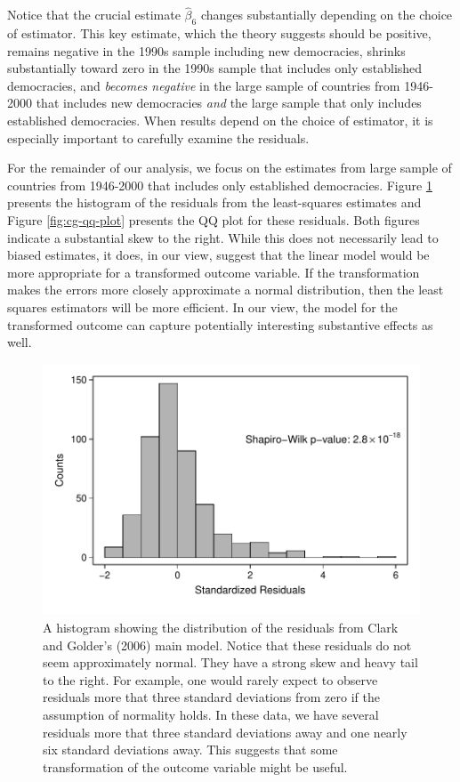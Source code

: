 \documentclass[12pt]{article}
\begin{document}
Notice that the crucial estimate $\hat{\beta}_6$ changes substantially depending on the choice of estimator. This key estimate, which the theory suggests should be positive, remains negative in the 1990s sample including new democracies, shrinks substantially toward zero in the 1990s sample that includes only established democracies, and \textit{becomes negative} in the large sample of countries from 1946-2000 that includes new democracies \textit{and} the large sample that only includes established democracies. When results depend on the choice of estimator, it is especially important to carefully examine the residuals.

For the remainder of our analysis, we focus on the estimates from large sample of countries from 1946-2000 that includes only established democracies. Figure \ref{fig:cg-residuals-hist} presents the histogram of the residuals from the least-squares estimates and Figure \ref{fig:cg-qq-plot} presents the QQ plot for these residuals. Both figures indicate a substantial skew to the right. While this does not necessarily lead to biased estimates, it does, in our view, suggest that the linear model would be more appropriate for a transformed outcome variable. If the transformation makes the errors more closely approximate a normal distribution, then the least squares estimators will be more efficient. In our view, the model for the transformed outcome can capture potentially interesting substantive effects as well.

\begin{figure}[H]
\begin{center}
\includegraphics[scale = 0.6]{figs/cg-residuals-hist.pdf}
\caption{A histogram showing the distribution of the residuals from Clark and Golder's (2006) main model. Notice that these residuals do not seem approximately normal. They have a strong skew and heavy tail to the right. For example, one would rarely expect to observe residuals more that three standard deviations from zero if the assumption of normality holds. In these data, we have several residuals more that three standard deviations away and one nearly six standard deviations away. This suggests that some transformation of the outcome variable might be useful.}\label{fig:cg-residuals-hist}	
\end{center}
\end{figure}
\end{document}
